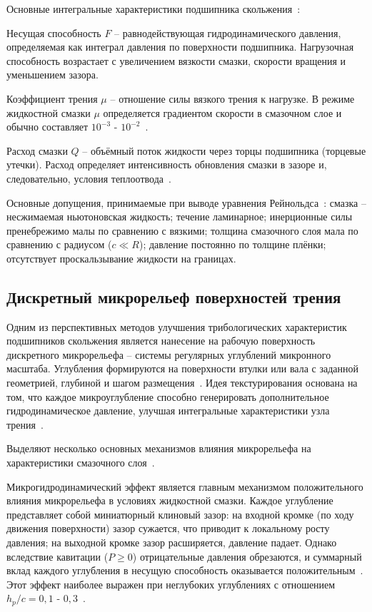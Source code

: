 Основные интегральные характеристики подшипника скольжения~\cite{hamrock}:

Несущая способность $F$ -- равнодействующая гидродинамического давления, определяемая как интеграл давления по поверхности подшипника. Нагрузочная способность возрастает с увеличением вязкости смазки, скорости вращения и уменьшением зазора.

Коэффициент трения $\mu$ -- отношение силы вязкого трения к нагрузке. В режиме жидкостной смазки $\mu$ определяется градиентом скорости в смазочном слое и обычно составляет $10^{-3}\text{ - }10^{-2}$~\cite{pinkus}.

Расход смазки $Q$ -- объёмный поток жидкости через торцы подшипника (торцевые утечки). Расход определяет интенсивность обновления смазки в зазоре и, следовательно, условия теплоотвода~\cite{hamrock}.

Основные допущения, принимаемые при выводе уравнения Рейнольдса~\cite{hamrock}: смазка -- несжимаемая ньютоновская жидкость; течение ламинарное; инерционные силы пренебрежимо малы по сравнению с вязкими; толщина смазочного слоя мала по сравнению с радиусом ($c \ll R$); давление постоянно по толщине плёнки; отсутствует проскальзывание жидкости на границах.

\subsection{Дискретный микрорельеф поверхностей трения}

Одним из перспективных методов улучшения трибологических характеристик подшипников скольжения является нанесение на рабочую поверхность дискретного микрорельефа -- системы регулярных углублений микронного масштаба. Углубления формируются на поверхности втулки или вала с заданной геометрией, глубиной и шагом размещения~\cite{etsion2005}. Идея текстурирования основана на том, что каждое микроуглубление способно генерировать дополнительное гидродинамическое давление, улучшая интегральные характеристики узла трения~\cite{gropper2016}.

Выделяют несколько основных механизмов влияния микрорельефа на характеристики смазочного слоя~\cite{fowell2007, gropper2016}.

Микрогидродинамический эффект является главным механизмом положительного влияния микрорельефа в условиях жидкостной смазки. Каждое углубление представляет собой миниатюрный клиновый зазор: на входной кромке (по ходу движения поверхности) зазор сужается, что приводит к локальному росту давления; на выходной кромке зазор расширяется, давление падает. Однако вследствие кавитации ($P \geq 0$) отрицательные давления обрезаются, и суммарный вклад каждого углубления в несущую способность оказывается положительным~\cite{fowell2007, brizmer2003}. Этот эффект наиболее выражен при неглубоких углублениях с отношением $h_p/c = 0{,}1\text{ - }0{,}3$~\cite{rahmani2007}.

